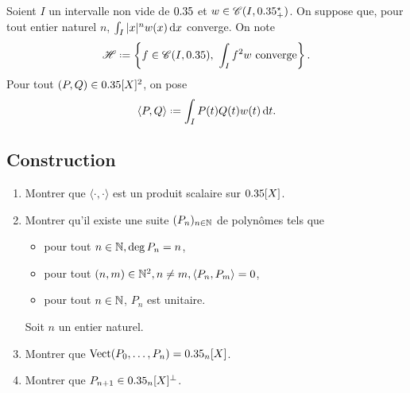 Soient $I$ un intervalle non vide de $0.35$ et $w \in \mathscr{C}(I, 0.35^\star_+)$. On suppose que, pour tout entier naturel $n$, $\int_I |x|^n w(x) \, \mathrm{d} x$ converge. On note
$$\mathscr{H} \defeq \left\{ f \in \mathscr{C}(I, \R),\ \int_I f^2 w \text{ converge} \right\}.$$
Pour tout $(P, Q) \in 0.35[X]^2$, on pose 
$$\langle P, Q \rangle \defeq \int_I P(t) Q(t) w(t) \d t.$$

\subsection{Construction}

\begin{exercice}
    \begin{enumerate}
        \item Montrer que $\langle \cdot, \cdot \rangle$ est un produit scalaire sur $0.35[X]$.
        \item Montrer qu'il existe une suite $(P_n)_{n \in \mathbb{N}}$ de polynômes tels que 
        \begin{itemize}
            \item pour tout $n \in \mathbb{N}, \deg P_n = n$,
            \item pour tout $(n, m) \in \mathbb{N}^2, n \not= m, \langle P_n, P_m \rangle = 0$,
            \item pour tout $n \in \mathbb{N}$, $P_n$ est unitaire.
        \end{itemize}
        Soit $n$ un entier naturel.
        \item Montrer que $\mathrm{Vect}(P_0, \dots, P_n) = 0.35_n[X]$.
        \item Montrer que $P_{n+1} \in 0.35_n[X]^\perp$.
    \end{enumerate}
\end{exercice}

